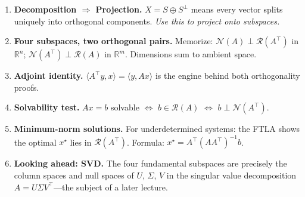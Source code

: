 \documentclass[10pt, twocolumn]{article}
\theoremstyle{definition}
\theoremstyle{plain}
\newcommand{\RR}{\mathbb{R}}
\newcommand{\NN}{\mathcal{N}}
\newcommand{\Range}{\mathcal{R}}
\begin{document}
\begin{enumerate}
    \item \textbf{Decomposition $\Rightarrow$ Projection.} $X = S \oplus S^\perp$ means every vector splits uniquely into orthogonal components. \emph{Use this to project onto subspaces.}

    \item \textbf{Four subspaces, two orthogonal pairs.} Memorize: $\NN(A) \perp \Range(A^\top)$ in $\RR^n$; $\NN(A^\top) \perp \Range(A)$ in $\RR^m$. Dimensions sum to ambient space.

    \item \textbf{Adjoint identity.} $\langle A^\top y, x \rangle = \langle y, Ax \rangle$ is the engine behind both orthogonality proofs.

    \item \textbf{Solvability test.} $Ax = b$ solvable $\Leftrightarrow$ $b \in \Range(A)$ $\Leftrightarrow$ $b \perp \NN(A^\top)$.

    \item \textbf{Minimum-norm solutions.} For underdetermined systems: the FTLA shows the optimal $x^\star$ lies in $\Range(A^\top)$. Formula: $x^\star = A^\top(AA^\top)^{-1}b$.

    \item \textbf{Looking ahead: SVD.} The four fundamental subspaces are precisely the column spaces and null spaces of $U$, $\Sigma$, $V$ in the singular value decomposition $A = U\Sigma V^\top$---the subject of a later lecture.
\end{enumerate}
\end{document}

